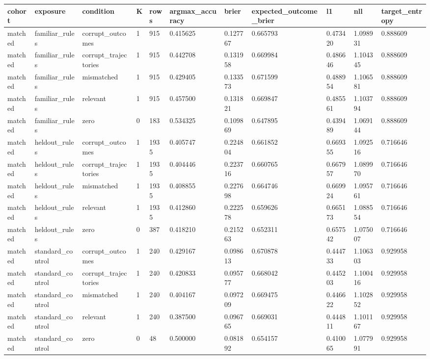 \begin{tabular}{lllllllllll}
\hline
cohort & exposure & condition & K & rows & argmax\_accuracy & brier & expected\_outcome\_brier & l1 & nll & target\_entropy \\
\hline
matched & familiar\_rules & corrupt\_outcomes & 1 & 915 & 0.415625 & 0.127767 & 0.665793 & 0.473420 & 1.098931 & 0.888609 \\
matched & familiar\_rules & corrupt\_trajectories & 1 & 915 & 0.442708 & 0.131958 & 0.669984 & 0.486646 & 1.104345 & 0.888609 \\
matched & familiar\_rules & mismatched & 1 & 915 & 0.429405 & 0.133573 & 0.671599 & 0.488954 & 1.106581 & 0.888609 \\
matched & familiar\_rules & relevant & 1 & 915 & 0.457500 & 0.131821 & 0.669847 & 0.485561 & 1.103794 & 0.888609 \\
matched & familiar\_rules & zero & 0 & 183 & 0.534325 & 0.109869 & 0.647895 & 0.439489 & 1.069144 & 0.888609 \\
matched & heldout\_rules & corrupt\_outcomes & 1 & 1935 & 0.405747 & 0.224804 & 0.661852 & 0.669355 & 1.092516 & 0.716646 \\
matched & heldout\_rules & corrupt\_trajectories & 1 & 1935 & 0.404446 & 0.223716 & 0.660765 & 0.667957 & 1.089970 & 0.716646 \\
matched & heldout\_rules & mismatched & 1 & 1935 & 0.408855 & 0.227698 & 0.664746 & 0.669924 & 1.095761 & 0.716646 \\
matched & heldout\_rules & relevant & 1 & 1935 & 0.412860 & 0.222578 & 0.659626 & 0.665173 & 1.088554 & 0.716646 \\
matched & heldout\_rules & zero & 0 & 387 & 0.418210 & 0.215263 & 0.652311 & 0.657542 & 1.075007 & 0.716646 \\
matched & standard\_control & corrupt\_outcomes & 1 & 240 & 0.429167 & 0.098613 & 0.670878 & 0.444733 & 1.106303 & 0.929958 \\
matched & standard\_control & corrupt\_trajectories & 1 & 240 & 0.420833 & 0.095777 & 0.668042 & 0.445203 & 1.100416 & 0.929958 \\
matched & standard\_control & mismatched & 1 & 240 & 0.404167 & 0.097209 & 0.669475 & 0.446622 & 1.102852 & 0.929958 \\
matched & standard\_control & relevant & 1 & 240 & 0.387500 & 0.096765 & 0.669031 & 0.444811 & 1.101167 & 0.929958 \\
matched & standard\_control & zero & 0 & 48 & 0.500000 & 0.081892 & 0.654157 & 0.410065 & 1.077991 & 0.929958 \\

\end{tabular}
